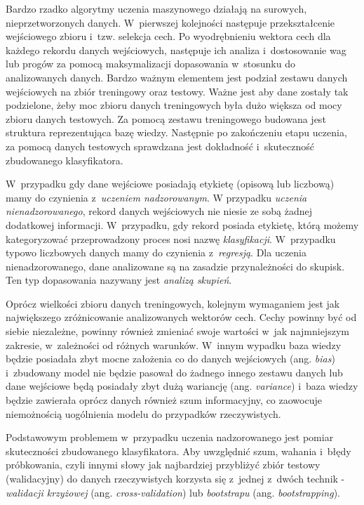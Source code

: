    Bardzo rzadko algorytmy uczenia maszynowego działają na surowych, nieprzetworzonych danych. W~pierwszej kolejności następuje przekształcenie wejściowego zbioru i~tzw. selekcja cech. Po wyodrębnieniu wektora cech dla każdego rekordu danych wejściowych, następuje ich analiza i~dostosowanie wag lub progów za pomocą maksymalizacji dopasowania w~stosunku do analizowanych danych. Bardzo ważnym elementem jest podział zestawu danych wejściowych na zbiór treningowy oraz testowy. Ważne jest aby dane zostały tak podzielone, żeby moc zbioru danych treningowych była dużo większa od mocy zbioru danych testowych. Za pomocą zestawu treningowego budowana jest struktura reprezentująca bazę wiedzy. Następnie po zakończeniu etapu uczenia, za pomocą danych testowych sprawdzana jest dokładność i~skuteczność zbudowanego klasyfikatora.

    W~przypadku gdy dane wejściowe posiadają etykietę (opisową lub liczbową) mamy do czynienia z~\textit{uczeniem nadzorowanym}. W przypadku \textit{uczenia nienadzorowanego}, rekord danych wejściowych nie niesie ze sobą żadnej dodatkowej informacji. W~przypadku, gdy rekord posiada etykietę, którą możemy kategoryzować przeprowadzony proces nosi nazwę \textit{klasyfikacji}. W~przypadku typowo liczbowych danych mamy do czynienia z~\textit{regresją}. Dla uczenia nienadzorowanego, dane analizowane są na zasadzie przynależności do skupisk. Ten typ dopasowania nazywany jest \textit{analizą skupień}.

    Oprócz wielkości zbioru danych treningowych, kolejnym wymaganiem jest jak największego zróżnicowanie analizowanych wektorów cech. Cechy powinny być od siebie niezależne, powinny również zmieniać swoje wartości w~jak najmniejszym zakresie, w~zależności od różnych warunków. W~innym wypadku baza wiedzy będzie posiadała zbyt mocne założenia co do danych wejściowych (ang. \textit{bias}) i~zbudowany model nie będzie pasował do żadnego innego zestawu danych lub dane wejściowe będą posiadały zbyt dużą wariancję (ang. \textit{variance}) i~baza wiedzy będzie zawierała oprócz danych również szum informacyjny, co zaowocuje niemożnością uogólnienia modelu do przypadków rzeczywistych.

    Podstawowym problemem w~przypadku uczenia nadzorowanego jest pomiar skuteczności zbudowanego klasyfikatora. Aby uwzględnić szum, wahania i~błędy próbkowania, czyli innymi słowy jak najbardziej przybliżyć zbiór testowy (walidacyjny) do danych rzeczywistych korzysta się z~jednej z~dwóch technik - \textit{walidacji krzyżowej} (ang. \textit{cross-validation}) lub \textit{bootstrapu} (ang. \textit{bootstrapping}).

